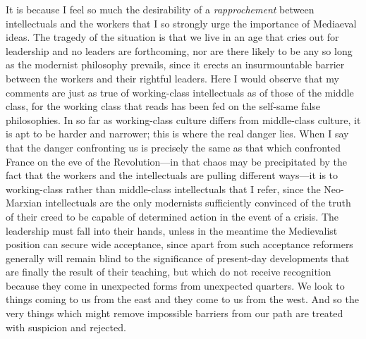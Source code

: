 \documentclass{book}
\begin{document}
It is because I feel so much the desirability of a \emph{rapprochement} between intellectuals and the workers that I so strongly urge the importance of Mediaeval ideas. The tragedy of the situation is that we live in an age that cries out for leadership and no leaders are forthcoming, nor are there likely to be any so long as the modernist philosophy prevails, since it erects an insurmountable barrier between the workers and their rightful leaders. Here I would observe that my comments are just as true of working-class intellectuals as of those of the middle class, for the working class that reads has been fed on the self-same false philosophies. In so far as working-class culture differs from middle-class culture, it is apt to be harder and narrower; this is where the real danger lies. When I say that the danger confronting us is precisely the same as that which confronted France on the eve of the Revolution—in that chaos may be precipitated by the fact that the workers and the intellectuals are pulling different ways—it is to working-class rather than middle-class intellectuals that I refer, since the Neo-Marxian intellectuals are the only modernists sufficiently convinced of the truth of their creed to be capable of determined action in the event of a crisis. The leadership must fall into their hands, unless in the meantime the Medievalist position can secure wide acceptance, since apart from such acceptance reformers generally will remain blind to the significance of present-day developments that are finally the result of their teaching, but which do not receive recognition because they come in unexpected forms from unexpected quarters. We look to things coming to us from the east and they come to us from the west. And so the very things which might remove impossible barriers from our path are treated with suspicion and rejected.
\end{document}
